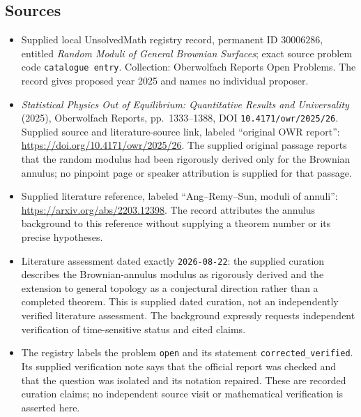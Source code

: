 \documentclass[11pt]{article}
\begin{document}
\subsection{Sources}
\begin{itemize}
\item Supplied local UnsolvedMath registry record, permanent ID \(30006286\), entitled \emph{Random Moduli of General Brownian Surfaces}; exact source problem code \texttt{catalogue entry}. Collection: Oberwolfach Reports Open Problems. The record gives proposed year 2025 and names no individual proposer.
\item \emph{Statistical Physics Out of Equilibrium: Quantitative Results and Universality} (2025), Oberwolfach Reports, pp.\ 1333--1388, DOI \texttt{10.4171/owr/2025/26}. Supplied source and literature-source link, labeled ``original OWR report'': \url{https://doi.org/10.4171/owr/2025/26}. The supplied original passage reports that the random modulus had been rigorously derived only for the Brownian annulus; no pinpoint page or speaker attribution is supplied for that passage.
\item Supplied literature reference, labeled ``Ang--Remy--Sun, moduli of annuli'': \url{https://arxiv.org/abs/2203.12398}. The record attributes the annulus background to this reference without supplying a theorem number or its precise hypotheses.
\item Literature assessment dated exactly \texttt{2026-08-22}: the supplied curation describes the Brownian-annulus modulus as rigorously derived and the extension to general topology as a conjectural direction rather than a completed theorem. This is supplied dated curation, not an independently verified literature assessment. The background expressly requests independent verification of time-sensitive status and cited claims.
\item The registry labels the problem \texttt{open} and its statement \texttt{corrected\_verified}. Its supplied verification note says that the official report was checked and that the question was isolated and its notation repaired. These are recorded curation claims; no independent source visit or mathematical verification is asserted here.
\end{itemize}
\end{document}
